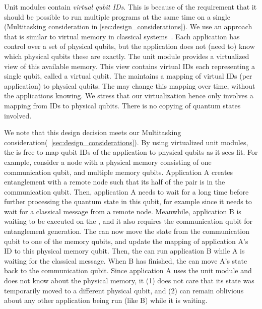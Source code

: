 Unit modules contain \textit{virtual qubit IDs}.
This is because of the requirement that it should be possible to run multiple programs at the same time on a single \QNPU (Multitasking consideration in \cref{sec:design_considerations}).
We use an approach that is similar to virtual memory in classical systems~\cite{arpaci2018operating}.
Each application has control over a set of physical qubits, but the application does not (need to) know which physical qubits these are exactly.
The unit module provides a virtualized view of this available memory.
This view contains virtual IDs each representing a single qubit, called a virtual qubit.
The \QNPU maintains a mapping of virtual IDs (per application) to physical qubits.
The \QNPU may change this mapping over time, without the applications knowing.
We stress that our virtualization hence only involves a mapping from IDs to physical qubits.
There is no copying of quantum states involved.

We note that this design decision meets our Multitasking consideration(~\ref{sec:design_considerations}).
By using virtualized unit modules, the \QNPU is free to map qubit IDs of the application to physical qubits as it sees fit.
For example, consider a node with a physical memory consisting of one communication qubit, and multiple memory qubits.
Application A creates entanglement with a remote node such that its half of the pair is in the communication qubit.
Then, application A needs to wait for a long time before further processing the quantum state in this qubit, for example since it needs to wait for a classical message from a remote node.
Meanwhile, application B is waiting to be executed on the \QNPU, and it also requires the communication qubit for entanglement generation.
The \QNPU can now move the state from the communication qubit to one of the memory qubits, and update the mapping of application A's ID to this physical memory qubit.
Then, the \QNPU can run application B while A is waiting for the classical message.
When B has finished, the \QNPU can move A's state back to the communication qubit.
Since application A uses the unit module and does not know about the physical memory, it
    (1) does not care that its state was temporarily moved to a different physical qubit, and
    (2) can remain oblivious about any other application being run (like B) while it is waiting.


